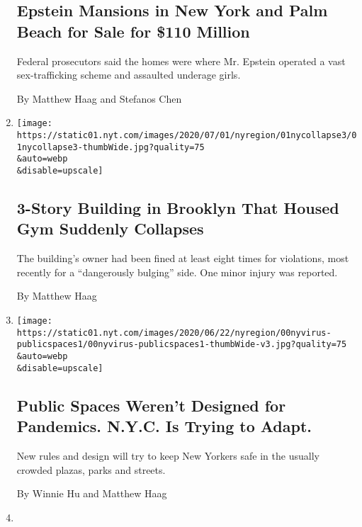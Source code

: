 \begin{enumerate}
{  \subsection{Epstein Mansions in New York and Palm Beach for Sale for
  \$110
  Million}\label{epstein-mansions-in-new-york-and-palm-beach-for-sale-for-110-million}}

  Federal prosecutors said the homes were where Mr. Epstein operated a
  vast sex-trafficking scheme and assaulted underage girls.

  By Matthew Haag and Stefanos Chen
\item
  \href{/2020/07/01/nyregion/brooklyn-building-collapse.html}{}

  \texttt{[image: https://static01.nyt.com/images/2020/07/01/nyregion/01nycollapse3/01nycollapse3-thumbWide.jpg?quality=75\\\&auto=webp\\\&disable=upscale]}

  \hypertarget{3-story-building-in-brooklyn-that-housed-gym-suddenly-collapses}{%
  \subsection{3-Story Building in Brooklyn That Housed Gym Suddenly
  Collapses}\label{3-story-building-in-brooklyn-that-housed-gym-suddenly-collapses}}

  The building's owner had been fined at least eight times for
  violations, most recently for a ``dangerously bulging'' side. One
  minor injury was reported.

  By Matthew Haag
\item
  \href{/2020/06/29/nyregion/nyc-parks-playgrounds-plazas-coronavirus.html}{}

  \texttt{[image: https://static01.nyt.com/images/2020/06/22/nyregion/00nyvirus-publicspaces1/00nyvirus-publicspaces1-thumbWide-v3.jpg?quality=75\\\&auto=webp\\\&disable=upscale]}

  \hypertarget{public-spaces-werent-designed-for-pandemics-nyc-is-trying-to-adapt}{%
  \subsection{Public Spaces Weren't Designed for Pandemics. N.Y.C. Is
  Trying to
  Adapt.}\label{public-spaces-werent-designed-for-pandemics-nyc-is-trying-to-adapt}}

  New rules and design will try to keep New Yorkers safe in the usually
  crowded plazas, parks and streets.

  By Winnie Hu and Matthew Haag
\item
  \href{/2020/06/26/nyregion/nyc-reopening-sunset-park.html}{}


\end{enumerate}
